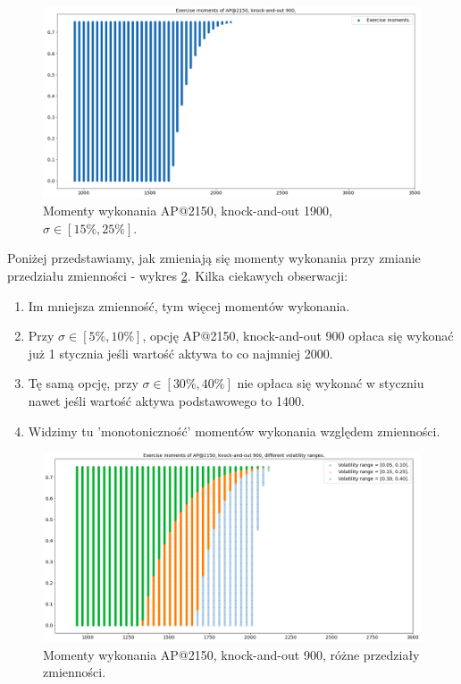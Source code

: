 \documentclass[12pt]{article}
\begin{document}
\begin{figure}[H]
    \centering
    \includegraphics[width=\textwidth,height=\textheight,keepaspectratio]{em_ap_2150_900.png}
    \caption{Momenty wykonania AP@2150, knock-and-out 1900, $\sigma \in [15\%, 25\%].$}
    \label{fig:em_ap_2150_900}
\end{figure}

Poniżej przedstawiamy, jak zmieniają się momenty wykonania przy zmianie przedziału zmienności - wykres \ref{fig:em_ap_2150_900_diff_vol}. Kilka ciekawych obserwacji:
\begin{enumerate}
    \item Im mniejsza zmienność, tym więcej momentów wykonania. 
    \item  Przy $\sigma \in [5\%, 10\%]$, opcję AP@2150, knock-and-out 900 opłaca się wykonać już 1 stycznia jeśli wartość aktywa to co najmniej 2000. 
    \item Tę samą opcję, przy $\sigma \in [30\%, 40\%]$ nie opłaca się wykonać w styczniu nawet jeśli wartość aktywa podstawowego to 1400. 
    \item Widzimy tu 'monotoniczność' momentów wykonania względem zmienności. 
\end{enumerate}

\begin{figure}[H]
    \centering
    \includegraphics[width=\textwidth,height=\textheight,keepaspectratio]{em_ap_2150_900_diff_vol.png}
    \caption{Momenty wykonania AP@2150, knock-and-out 900, różne przedziały zmienności.}
    \label{fig:em_ap_2150_900_diff_vol}
\end{figure}
\end{document}
